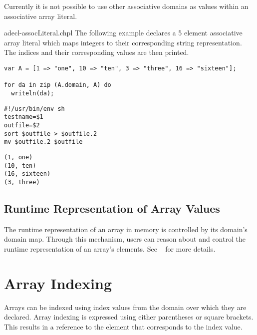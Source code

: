 \begin{openissue}
Currently it is not possible to use other associative domains as values within
an associative array literal.
\end{openissue}

\begin{chapelexample}{adecl-assocLiteral.chpl}
The following example declares a 5 element associative array literal which maps
integers to their corresponding string representation. The indices and their
corresponding values are then printed. 
\begin{chapel}
\begin{verbatim}
var A = [1 => "one", 10 => "ten", 3 => "three", 16 => "sixteen"];

for da in zip (A.domain, A) do
  writeln(da);
\end{verbatim}
\end{chapel}
\begin{chapelprediff}
\begin{verbatim}
#!/usr/bin/env sh
testname=$1
outfile=$2
sort $outfile > $outfile.2
mv $outfile.2 $outfile
\end{verbatim}
\end{chapelprediff}
\begin{chapeloutput}
\begin{verbatim}
(1, one)
(10, ten)
(16, sixteen)
(3, three)
\end{verbatim}
\end{chapeloutput}
\end{chapelexample}

\subsection{Runtime Representation of Array Values}
\label{Array_Runtime_Representation}

The runtime representation of an array in memory is controlled by its
domain's domain map.  Through this mechanism, users can reason about
and control the runtime representation of an array's elements.  See
~ for more details.


\section{Array Indexing}
\label{Array_Indexing}

Arrays can be indexed using index values from the domain over which
they are declared.  Array indexing is expressed using either
parentheses or square brackets.  This results in a reference to the
element that corresponds to the index value.

